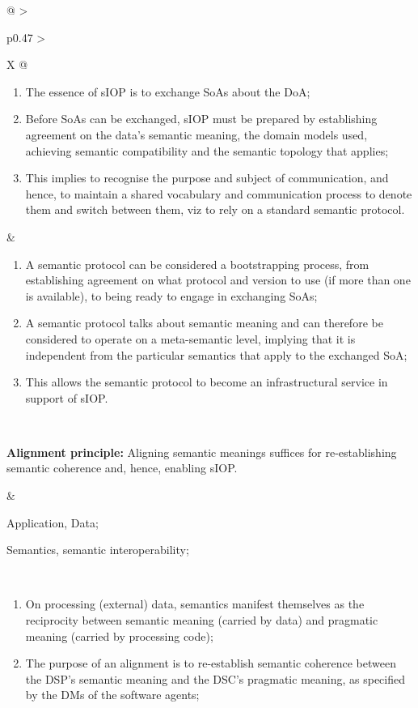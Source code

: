 \begin{xltabular}[l]{\linewidth}{@{} >{\small\raggedright\arraybackslash}p{0.47\linewidth} >{\small\raggedright\arraybackslash}X @{}}
\begin{enumerate}[left=6pt, nosep]
  \item The essence of sIOP is to exchange SoAs about the DoA;
  \item Before SoAs can be exchanged, sIOP must be prepared by establishing agreement on the data's semantic meaning, the domain models used, achieving semantic compatibility and the semantic topology that applies;
  \item This implies to recognise the purpose and subject of communication, and hence, to maintain a shared vocabulary and communication process to denote them and switch between them, viz to rely on a standard semantic protocol.
\end{enumerate}
&
\begin{enumerate}[left=10pt, nosep]
  \item A semantic protocol can be considered a bootstrapping process, from establishing agreement on what protocol and version to use (if more than one is available), to being ready to engage in exchanging SoAs;
  \item A semantic protocol talks about semantic meaning and can therefore be considered to operate on a meta-semantic level, implying that it is independent from the particular semantics that apply to the exchanged SoA;
  \item This allows the semantic protocol to become an infrastructural service in support of sIOP.
\end{enumerate} \\
%
%
%
\begin{mmdp}\label{dp:alignment}{\bfseries Alignment principle:}
\quad Aligning semantic meanings suffices for re-establishing semantic coherence and, hence, enabling sIOP. \end{mmdp}
&
\begin{description}[labelwidth=3.7cm,leftmargin=3.7cm+1ex,nosep,topsep=2ex,labelsep=1ex,font=\bfseries]
  \item[Type of information:] Application, Data;
  \item[Quality attributes:] Semantics, semantic interoperability;
\end{description}\\
\begin{enumerate}[left=6pt, nosep]
  \item On processing (external) data, semantics manifest themselves as the reciprocity between semantic meaning (carried by data) and pragmatic meaning (carried by processing code);
  \item The purpose of an alignment is to re-establish semantic coherence between the DSP's semantic meaning and the DSC's pragmatic meaning, as specified by the DMs of the software agents;

\end{enumerate}
\end{xltabular}
